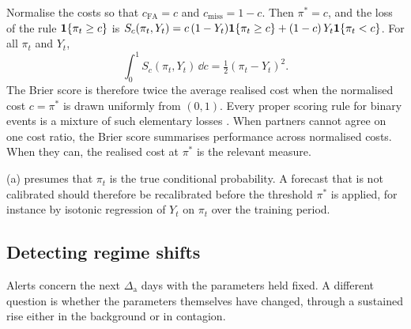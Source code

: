 \begin{remark}\label{rem:fc-brier}
Normalise the costs so that $c_{\mathrm{FA}}=c$ and $c_{\mathrm{miss}}=1-c$. Then
$\pi^*=c$, and the loss of the rule $\mathbf{1}\!\left\{\pi_t\ge c\right\}$ is
$S_c(\pi_t,Y_t)=c\,(1-Y_t)\mathbf{1}\!\left\{\pi_t\ge c\right\}+(1-c)\,Y_t\mathbf{1}\!\left\{\pi_t<c\right\}$. For all $\pi_t$
and $Y_t$,
\[
\int_0^1S_c(\pi_t,Y_t)\,\dd c=\tfrac12(\pi_t-Y_t)^2 .
\]
The Brier score is therefore twice the average realised cost when the normalised cost
$c=\pi^*$ is drawn uniformly from $(0,1)$. Every proper scoring rule for binary events is a mixture
of such elementary losses \citep{schervish1989}. When partners cannot agree on one cost
ratio, the Brier score summarises performance across normalised costs. When they can, the
realised cost at $\pi^*$ is the relevant measure.

(a) presumes that $\pi_t$ is the true conditional probability. A
forecast that is not calibrated should therefore be recalibrated before the threshold
$\pi^*$ is applied, for instance by isotonic regression of $Y_t$ on $\pi_t$ over the
training period.
\end{remark}

\subsection{Detecting regime shifts}\label{sec:fc-cusum}

Alerts concern the next $\Delta_{\mathrm a}$ days with the parameters held fixed. A different
question is whether the parameters themselves have changed, through a sustained rise
either in the background or in contagion.

